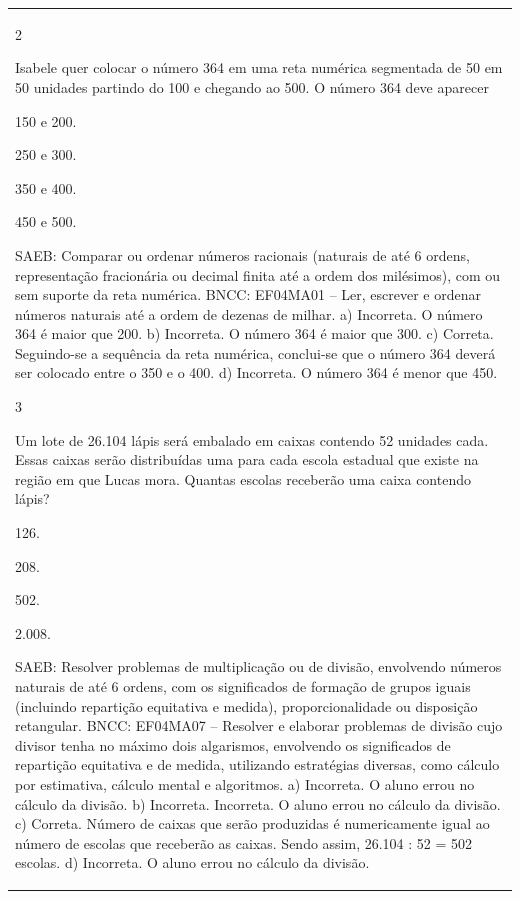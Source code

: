 \begin{mdframed}[linewidth=2pt,linecolor=salmao,roundcorner=2pt]
\begin{escolha}
{{{\begin{longtable}[]{@{}l@{}}
\begin{itemize}
{\num{2}

Isabele quer colocar o número 364 em uma reta numérica segmentada de 50 em 50 unidades partindo do 100 e chegando ao 500. O número 364 deve aparecer

\begin{escolha}
\item
  150 e 200.
\item
  250 e 300.
\item
  350 e 400.
\item
  450 e 500.
\end{escolha}

SAEB: Comparar ou ordenar números
racionais (naturais de até 6 ordens, representação fracionária ou
decimal finita até a ordem dos milésimos), com ou sem suporte da reta
numérica.
BNCC: EF04MA01 -- Ler, escrever e ordenar números naturais até a ordem de dezenas de milhar.
a) Incorreta. O número 364 é maior que 200.
b) Incorreta. O número 364 é maior que 300.
c) Correta. Seguindo-se a sequência da reta numérica, conclui-se que o número 364 deverá
ser colocado entre o 350 e o 400.
d) Incorreta. O número 364 é menor que 450.

\num{3}

Um lote de 26.104 lápis será embalado em caixas contendo 52 unidades cada. Essas caixas serão distribuídas uma para cada escola
estadual que existe na região em que Lucas mora. Quantas escolas
receberão uma caixa contendo lápis?

\begin{escolha}
\item
  126.
\item
  208.
\item
  502.
\item
  2.008.
\end{escolha}

SAEB: Resolver problemas de multiplicação ou de divisão,
envolvendo números naturais de até 6 ordens, com os significados de
formação de grupos iguais (incluindo repartição equitativa e medida),
proporcionalidade ou disposição retangular.
BNCC: EF04MA07 -- Resolver e elaborar problemas de divisão cujo divisor tenha no máximo dois algarismos,
envolvendo os significados de repartição equitativa e de medida, utilizando estratégias diversas,
como cálculo por estimativa, cálculo mental e algoritmos.
a) Incorreta. O aluno errou no cálculo da divisão.
b) Incorreta. Incorreta. O aluno errou no cálculo da divisão.
c) Correta. Número de caixas que serão produzidas é numericamente igual ao número de
escolas que receberão as caixas. Sendo assim, 26.104 : 52 = 502 escolas.
d) Incorreta. O aluno errou no cálculo da divisão.

}
\end{itemize}
\end{longtable}}}}
\end{escolha}
\end{mdframed}
